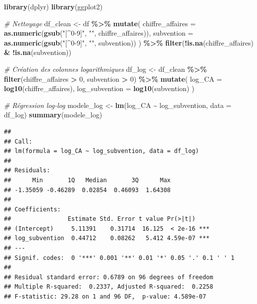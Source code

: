 \documentclass[mstat,12pt]{unswthesis}
\newenvironment{Shaded}{\begin{snugshade}}{\end{snugshade}}
\newcommand{\AttributeTok}[1]{\textcolor[rgb]{0.13,0.29,0.53}{#1}}
\newcommand{\CommentTok}[1]{\textcolor[rgb]{0.56,0.35,0.01}{\textit{#1}}}
\newcommand{\DecValTok}[1]{\textcolor[rgb]{0.00,0.00,0.81}{#1}}
\newcommand{\FunctionTok}[1]{\textcolor[rgb]{0.13,0.29,0.53}{\textbf{#1}}}
\newcommand{\NormalTok}[1]{#1}
\newcommand{\OtherTok}[1]{\textcolor[rgb]{0.56,0.35,0.01}{#1}}
\newcommand{\SpecialCharTok}[1]{\textcolor[rgb]{0.81,0.36,0.00}{\textbf{#1}}}
\newcommand{\StringTok}[1]{\textcolor[rgb]{0.31,0.60,0.02}{#1}}
\begin{document}
\begin{Shaded}
\begin{Highlighting}[]
\FunctionTok{library}\NormalTok{(dplyr)}
\FunctionTok{library}\NormalTok{(ggplot2)}

\CommentTok{\# Nettoyage}
\NormalTok{df\_clean }\OtherTok{\textless{}{-}}\NormalTok{ df }\SpecialCharTok{\%\textgreater{}\%}
  \FunctionTok{mutate}\NormalTok{(}
    \AttributeTok{chiffre\_affaires =} \FunctionTok{as.numeric}\NormalTok{(}\FunctionTok{gsub}\NormalTok{(}\StringTok{"[\^{}0{-}9]"}\NormalTok{, }\StringTok{""}\NormalTok{, chiffre\_affaires)),}
    \AttributeTok{subvention =} \FunctionTok{as.numeric}\NormalTok{(}\FunctionTok{gsub}\NormalTok{(}\StringTok{"[\^{}0{-}9]"}\NormalTok{, }\StringTok{""}\NormalTok{, subvention))}
\NormalTok{  ) }\SpecialCharTok{\%\textgreater{}\%}
  \FunctionTok{filter}\NormalTok{(}\SpecialCharTok{!}\FunctionTok{is.na}\NormalTok{(chiffre\_affaires) }\SpecialCharTok{\&} \SpecialCharTok{!}\FunctionTok{is.na}\NormalTok{(subvention))}

\CommentTok{\# Création des colonnes logarithmiques}
\NormalTok{df\_log }\OtherTok{\textless{}{-}}\NormalTok{ df\_clean }\SpecialCharTok{\%\textgreater{}\%}
  \FunctionTok{filter}\NormalTok{(chiffre\_affaires }\SpecialCharTok{\textgreater{}} \DecValTok{0}\NormalTok{, subvention }\SpecialCharTok{\textgreater{}} \DecValTok{0}\NormalTok{) }\SpecialCharTok{\%\textgreater{}\%}
  \FunctionTok{mutate}\NormalTok{(}
    \AttributeTok{log\_CA =} \FunctionTok{log10}\NormalTok{(chiffre\_affaires),}
    \AttributeTok{log\_subvention =} \FunctionTok{log10}\NormalTok{(subvention)}
\NormalTok{  )}

\CommentTok{\# Régression log{-}log}
\NormalTok{modele\_log }\OtherTok{\textless{}{-}} \FunctionTok{lm}\NormalTok{(log\_CA }\SpecialCharTok{\textasciitilde{}}\NormalTok{ log\_subvention, }\AttributeTok{data =}\NormalTok{ df\_log)}
\FunctionTok{summary}\NormalTok{(modele\_log)}
\end{Highlighting}
\end{Shaded}

\begin{verbatim}
## 
## Call:
## lm(formula = log_CA ~ log_subvention, data = df_log)
## 
## Residuals:
##      Min       1Q   Median       3Q      Max 
## -1.35059 -0.46289  0.02854  0.46093  1.64308 
## 
## Coefficients:
##                Estimate Std. Error t value Pr(>|t|)    
## (Intercept)     5.11391    0.31714  16.125  < 2e-16 ***
## log_subvention  0.44712    0.08262   5.412 4.59e-07 ***
## ---
## Signif. codes:  0 '***' 0.001 '**' 0.01 '*' 0.05 '.' 0.1 ' ' 1
## 
## Residual standard error: 0.6789 on 96 degrees of freedom
## Multiple R-squared:  0.2337, Adjusted R-squared:  0.2258 
## F-statistic: 29.28 on 1 and 96 DF,  p-value: 4.589e-07
\end{verbatim}
\end{document}
